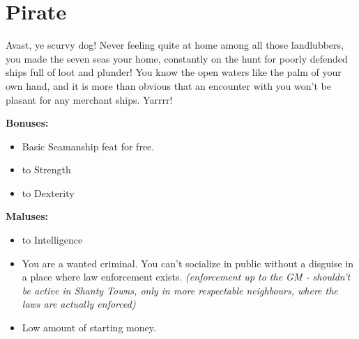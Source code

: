 \section{Pirate}
Avast, ye scurvy dog! Never feeling quite at home among all those landlubbers, you made the seven seas your home, constantly on the hunt for poorly defended ships full of loot and plunder! You know the open waters like the palm of your own hand, and it is more than obvious that an encounter with you won't be plasant for any merchant ships. Yarrrr!


\textbf{Bonuses:}
\begin{itemize}
	\item Basic Seamanship feat for free.
	\item {} to Strength
	\item {} to Dexterity
\end{itemize}


\textbf{Maluses:}
\begin{itemize}
	\item {} to Intelligence
	\item You are a wanted criminal. You can't socialize in public without a disguise in a place where law enforcement exists. \textit{(enforcement up to the GM - shouldn't be active in Shanty Towns, only in more respectable neighbours, where the laws are actually enforced)}
	\item Low amount of starting money.
\end{itemize}
